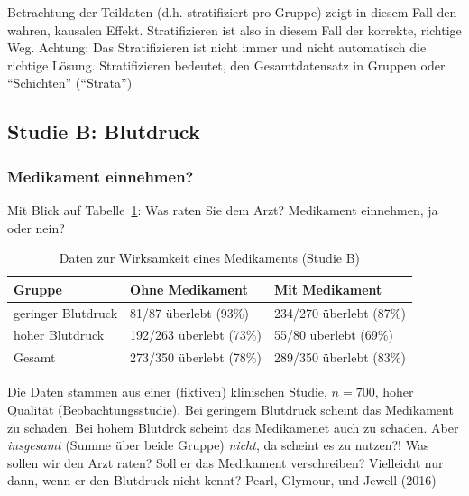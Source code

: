 \documentclass[
  a4paper,
  DIV=11]{scrreprt}
\theoremstyle{definition}
\theoremstyle{remark}
\begin{document}
\begin{tcolorbox}[enhanced jigsaw, title=\textcolor{quarto-callout-important-color}{\faExclamation}\hspace{0.5em}{Wichtig}, bottomtitle=1mm, bottomrule=.15mm, titlerule=0mm, colbacktitle=quarto-callout-important-color!10!white, colframe=quarto-callout-important-color-frame, leftrule=.75mm, left=2mm, toprule=.15mm, colback=white, arc=.35mm, breakable, toptitle=1mm, opacityback=0, rightrule=.15mm, coltitle=black, opacitybacktitle=0.6]

Betrachtung der Teildaten (d.h. stratifiziert pro Gruppe) zeigt in
diesem Fall den wahren, kausalen Effekt. Stratifizieren ist also in
diesem Fall der korrekte, richtige Weg. Achtung: Das Stratifizieren ist
nicht immer und nicht automatisch die richtige Lösung. Stratifizieren
bedeutet, den Gesamtdatensatz in Gruppen oder ``Schichten'' (``Strata'')

\end{tcolorbox}

\hypertarget{studie-b-blutdruck}{%
\subsection{Studie B: Blutdruck}\label{studie-b-blutdruck}}

\hypertarget{medikament-einnehmen-1}{%
\subsubsection{Medikament einnehmen?}\label{medikament-einnehmen-1}}

Mit Blick auf Tabelle~\ref{tbl-studie-b}: Was raten Sie dem Arzt?
Medikament einnehmen, ja oder nein?

\hypertarget{tbl-studie-b}{}
\begin{longtable}{lll}
\caption{\label{tbl-studie-b}Daten zur Wirksamkeit eines Medikaments (Studie B) }\tabularnewline

\toprule
Gruppe & Ohne Medikament & Mit Medikament \\ 
\midrule
geringer Blutdruck & 81/87 überlebt (93\%) & 234/270 überlebt (87\%) \\ 
hoher Blutdruck & 192/263 überlebt (73\%) & 55/80 überlebt (69\%) \\ 
Gesamt & 273/350 überlebt (78\%) & 289/350 überlebt (83\%) \\ 
\bottomrule
\end{longtable}

Die Daten stammen aus einer (fiktiven) klinischen Studie, \(n=700\),
hoher Qualität (Beobachtungsstudie). Bei geringem Blutdruck scheint das
Medikament zu schaden. Bei hohem Blutdrck scheint das Medikamenet auch
zu schaden. Aber \emph{insgesamt} (Summe über beide Gruppe)
\emph{nicht}, da scheint es zu nutzen?! Was sollen wir den Arzt raten?
Soll er das Medikament verschreiben? Vielleicht nur dann, wenn er den
Blutdruck nicht kennt? Pearl, Glymour, und Jewell (2016)
\end{document}
